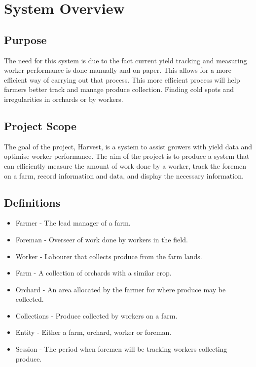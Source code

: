 \documentclass[11pt]{article}
\begin{document}
\newpage
{}
\tableofcontents
\newpage
\listoffigures

\newpage
{}

\newpage
\section{System Overview}

\subsection{Purpose}
The need for this system is due to the fact current yield tracking and measuring worker performance is done manually and on paper. This allows for a more efficient way of carrying out that process. This more efficient process will help farmers better track and manage produce collection. Finding cold spots and irregularities in orchards or by workers.

\subsection{Project Scope}
The goal of the project, Harvest, is a system to assist growers with yield data and optimise worker performance. The aim of the project is to produce a system that can efficiently measure the amount of work done by a worker, track the foremen on a farm, record information and data, and display the necessary information.

\subsection{Definitions}
\begin{itemize}
\item Farmer - The lead manager of a farm.
\item Foreman - Overseer of work done by workers in the field.
\item Worker - Labourer that collects produce from the farm lands.
\item Farm - A collection of orchards with a similar crop.
\item Orchard - An area allocated by the farmer for where produce may be collected.
\item Collections - Produce collected by workers on a farm.
\item Entity - Either a farm, orchard, worker or foreman.
\item Session - The period when foremen will be tracking workers collecting produce.
\end{itemize}
\end{document}

